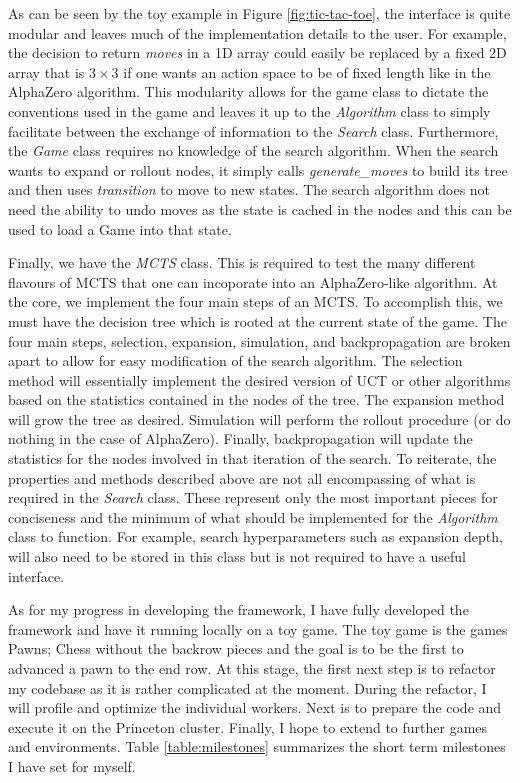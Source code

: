 \documentclass{article}
\begin{document}
  As can be seen by the toy example in Figure \ref{fig:tic-tac-toe}, the interface is quite modular and leaves much of the implementation details to the user. For example, the decision to return \textit{moves} in a 1D array could easily be replaced by a fixed 2D array that is $3 \times 3$ if one wants an action space to be of fixed length like in the AlphaZero algorithm. This modularity allows for the game class to dictate the conventions used in the game and leaves it up to the \textit{Algorithm} class to simply facilitate between the exchange of information to the \textit{Search} class. Furthermore, the \textit{Game} class requires no knowledge of the search algorithm. When the search wants to expand or rollout nodes, it simply calls \textit{generate\_moves} to build its tree and then uses \textit{transition} to move to new states. The search algorithm does not need the ability to undo moves as the state is cached in the nodes and this can be used to load a Game into that state.

  Finally, we have the \textit{MCTS} class. This is required to test the many different flavours of MCTS that one can incoporate into an AlphaZero-like algorithm. At the core, we implement the four main steps of an MCTS. To accomplish this, we must have the decision tree which is rooted at the current state of the game. The four main steps, selection, expansion, simulation, and backpropagation are broken apart to allow for easy modification of the search algorithm. The selection method will essentially implement the desired version of UCT or other algorithms based on the statistics contained in the nodes of the tree. The expansion method will grow the tree as desired. Simulation will perform the rollout procedure (or do nothing in the case of AlphaZero). Finally, backpropagation will update the statistics for the nodes involved in that iteration of the search. To reiterate, the properties and methods described above are not all encompassing of what is required in the \textit{Search} class. These represent only the most important pieces for conciseness and the minimum of what should be implemented for the \textit{Algorithm} class to function. For example, search hyperparameters such as expansion depth, will also need to be stored in this class but is not required to have a useful interface.

  As for my progress in developing the framework, I have fully developed the framework and have it running locally on a toy game. The toy game is the games Pawns; Chess without the backrow pieces and the goal is to be the first to advanced a pawn to the end row. At this stage, the first next step is to refactor my codebase as it is rather complicated at the moment. During the refactor, I will profile and optimize the individual workers. Next is to prepare the code and execute it on the Princeton cluster. Finally, I hope to extend to further games and environments. Table \ref{table:milestones} summarizes the short term milestones I have set for myself.
\end{document}
